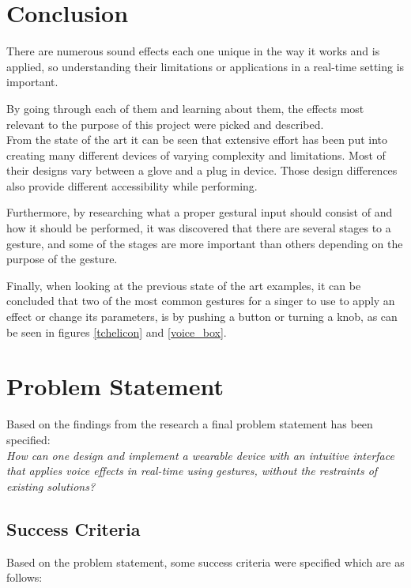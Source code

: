 \section{Conclusion}

There are numerous sound effects each one unique in the way it works and is applied, so understanding their limitations or applications in a real-time setting is important.

By going through each of them and learning about them, the effects most relevant to the purpose of this project were picked and described.\\

From the state of the art it can be seen that extensive effort has been put into creating many different devices of varying complexity and limitations. Most of their designs vary between a glove and a plug in device. Those design differences also provide different accessibility while performing.

Furthermore, by researching what a proper gestural input should consist of and how it should be performed, it was discovered that there are several stages to a gesture, and some of the stages are more important than others depending on the purpose of the gesture.

Finally, when looking at the previous state of the art examples, it can be concluded that two of the most common gestures for a singer to use to apply an effect or change its parameters, is by pushing a button or turning a knob, as can be seen in figures \ref{tchelicon} and \ref{voice_box}.

\section{Problem Statement}

Based on the findings from the research a final problem statement has been specified:\\

\textit{How can one design and implement a wearable device with an intuitive interface that applies voice effects in real-time using gestures, without the restraints of existing solutions?}

\subsection{Success Criteria}


Based on the problem statement, some success criteria were specified which are as follows: 

